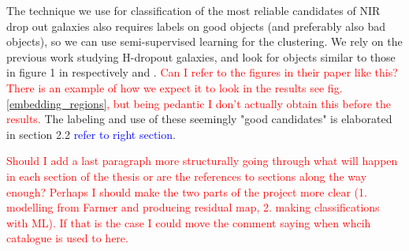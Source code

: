The technique we use for classification of the most reliable candidates of NIR drop out galaxies also requires labels on good objects (and preferably also bad objects), so we can use semi-supervised learning for the clustering. We rely on the previous work studying H-dropout galaxies, and look for objects similar to those in figure 1 in respectively \cite{Alcalde_Pampliega_2019} and \cite{Wang_2019}. \textcolor{red}{Can I refer to the figures in their paper like this? There is an example of how we expect it to look in the results see fig. \ref{embedding_regions}, but being pedantic I don't actually obtain this before the results.} The labeling and use of these seemingly "good candidates" is elaborated in section 2.2 \textcolor{blue}{refer to right section}.

\textcolor{red}{Should I add a last paragraph more structurally going through what will happen in each section of the thesis or are the references to sections along the way enough?}
\textcolor{red}{Perhaps I should make the two parts of the project more clear (1. modelling from Farmer and producing residual map, 2. making classifications with ML). If that is the case I could move the comment saying when whcih catalogue is used to here.}